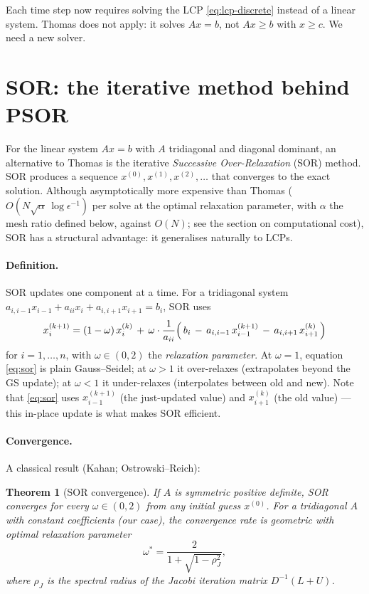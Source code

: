 \documentclass[11pt,a4paper]{article}
\newtheorem{theorem}[proposition]{Theorem}
\begin{document}
Each time step now requires solving the LCP \eqref{eq:lcp-discrete}
instead of a linear system. Thomas does not apply: it solves
$Ax = b$, not $Ax \geq b$ with $x \geq c$. We need a new solver.

\section{SOR: the iterative method behind PSOR}

For the linear system $Ax = b$ with $A$ tridiagonal and diagonal
dominant, an alternative to Thomas is the iterative
\emph{Successive Over-Relaxation} (SOR) method. SOR produces a
sequence $x^{(0)}, x^{(1)}, x^{(2)}, \dots$ that converges to the
exact solution. Although asymptotically more expensive than Thomas
($O(N\sqrt{\alpha}\,\log\epsilon^{-1})$ per solve at the optimal
relaxation parameter, with $\alpha$ the mesh ratio defined below,
against $O(N)$; see the section on computational cost), SOR has a
structural advantage: it generalises naturally to LCPs.

\paragraph{Definition.} SOR updates one component at a time. For a
tridiagonal system $a_{i,i-1} x_{i-1} + a_{ii} x_i + a_{i,i+1}
x_{i+1} = b_i$, SOR uses
\begin{equation}
x_i^{(k+1)} = (1 - \omega)\,x_i^{(k)} \,+\,
\omega \cdot \frac{1}{a_{ii}}\Bigl(\, b_i \,-\, a_{i,i-1}\,
x_{i-1}^{(k+1)} \,-\, a_{i,i+1}\,x_{i+1}^{(k)} \,\Bigr)
\label{eq:sor}
\end{equation}
for $i = 1, \dots, n$, with $\omega \in (0, 2)$ the
\emph{relaxation parameter}. At $\omega = 1$, equation \eqref{eq:sor}
is plain Gauss--Seidel; at $\omega > 1$ it over-relaxes (extrapolates
beyond the GS update); at $\omega < 1$ it under-relaxes
(interpolates between old and new). Note that \eqref{eq:sor} uses
$x_{i-1}^{(k+1)}$ (the just-updated value) and $x_{i+1}^{(k)}$ (the
old value) --- this in-place update is what makes SOR efficient.

\paragraph{Convergence.} A classical result (Kahan; Ostrowski--Reich):

\begin{theorem}[SOR convergence]
If $A$ is symmetric positive definite, SOR converges for every
$\omega \in (0, 2)$ from any initial guess $x^{(0)}$. For a
tridiagonal $A$ with constant coefficients (our case), the
convergence rate is geometric with optimal relaxation parameter
\begin{equation}
\omega^* = \frac{2}{1 + \sqrt{1 - \rho_J^2}},
\label{eq:omega-star}
\end{equation}
where $\rho_J$ is the spectral radius of the Jacobi iteration matrix
$D^{-1}(L + U)$.
\end{theorem}
\end{document}
